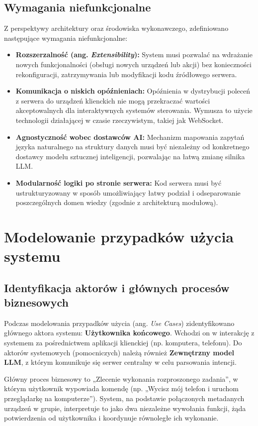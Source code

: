 \subsection{Wymagania niefunkcjonalne}
\label{subsec:wymagania_niefunkcjonalne}
Z perspektywy architektury oraz środowiska wykonawczego, zdefiniowano następujące wymagania niefunkcjonalne:
\begin{itemize}
	\item \textbf{Rozszerzalność (ang. \textit{Extensibility}):} System musi pozwalać na wdrażanie nowych funkcjonalności (obsługi nowych urządzeń lub akcji) bez konieczności rekonfiguracji, zatrzymywania lub modyfikacji kodu źródłowego serwera.
	\item \textbf{Komunikacja o niskich opóźnieniach:} Opóźnienia w dystrybucji poleceń z serwera do urządzeń klienckich nie mogą przekraczać wartości akceptowalnych dla interaktywnych systemów sterowania. Wymusza to użycie technologii działającej w czasie rzeczywistym, takiej jak WebSocket.
	\item \textbf{Agnostyczność wobec dostawców AI:} Mechanizm mapowania zapytań języka naturalnego na struktury danych musi być niezależny od konkretnego dostawcy modelu sztucznej inteligencji, pozwalając na łatwą zmianę silnika LLM.
	\item \textbf{Modularność logiki po stronie serwera:} Kod serwera musi być ustrukturyzowany w sposób umożliwiający łatwy podział i odseparowanie poszczególnych domen wiedzy (zgodnie z architekturą modułową).
\end{itemize}

\section{Modelowanie przypadków użycia systemu}
\label{sec:przypadki_uzycia}

\subsection{Identyfikacja aktorów i głównych procesów biznesowych}
\label{subsec:aktorzy}
Podczas modelowania przypadków użycia (ang. \textit{Use Cases}) zidentyfikowano głównego aktora systemu: \textbf{Użytkownika końcowego}. Wchodzi on w interakcję z systemem za pośrednictwem aplikacji klienckiej (np. komputera, telefonu). Do aktorów systemowych (pomocniczych) należą również \textbf{Zewnętrzny model LLM}, z którym komunikuje się serwer centralny w celu parsowania intencji.

Główny proces biznesowy to „Zlecenie wykonania rozproszonego zadania”, w którym użytkownik wypowiada komendę (np. „Wycisz mój telefon i uruchom przeglądarkę na komputerze”). System, na podstawie połączonych metadanych urządzeń w grupie, interpretuje to jako dwa niezależne wywołania funkcji, żąda potwierdzenia od użytkownika i koordynuje równoległe ich wykonanie.

